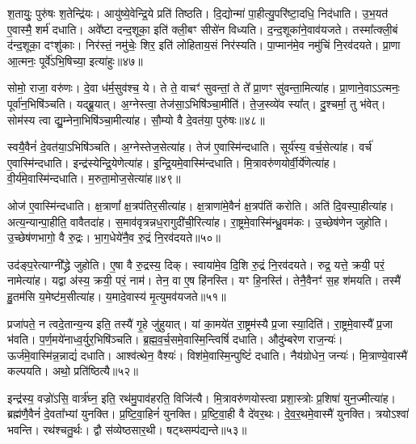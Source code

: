 श॒तायुः॒ पुरु॑षः श॒तेन्द्रि॑यः।
आयु॑ष्ये॒वेन्द्रि॒ये प्रति॑ तिष्ठति।
दि॒द्योन्मा॑ पा॒हीत्यु॒परि॑ष्टा॒दधि॒ निद॑धाति।
उ॒भ॒यत॑ ए॒वास्मै॒ शर्म॑ दधाति।
अवे᳚ष्टा दन्द॒शूका॒ इति॑ क्ली॒बꣳ सीसे॑न विध्यति।
द॒न्द॒शूका॑ने॒वाव॑यजते।
तस्मा᳚त्क्ली॒बं द॑न्द॒शूका॒ दꣳशु॑काः।
निर॑स्तं॒ नमु॑चेः॒ शिर॒ इति॑ लोहिताय॒सं निर॑स्यति।
पा॒प्मान॑मे॒व नमु॑चिं नि॒रव॑दयते।
प्रा॒णा आ॒त्मनः॒ पूर्वे॑\-ऽभि॒षिच्या॒ इत्या॑हुः॥४७॥

सोमो॒ राजा॒ वरु॑णः।
दे॒वा ध॑र्म॒सुव॑श्च॒ ये।
ते ते॒ वाचꣳ॑ सुवन्तां॒ ते ते᳚ प्रा॒णꣳ सु॑वन्ता॒मित्या॑ह।
प्रा॒णाने॒वा\-ऽऽत्मनः॒ पूर्वा॑न॒भिषि॑ञ्चति।
यद्ब्रू॒यात्।
अ॒ग्नेस्त्वा॒ तेज॑सा॒\-ऽभिषि॑ञ्चा॒मीति॑।
ते॒ज॒स्व्ये॑व स्या᳚त्।
दु॒श्चर्मा॒ तु भ॑वेत्।
सोम॑स्य त्वा द्यु॒म्नेना॒भिषि॑ञ्चा॒मीत्या॑ह।
सौ॒म्यो वै दे॒वत॑या॒ पुरु॑षः॥४८॥

स्वयै॒वैनं॑ दे॒वत॑या॒\-ऽभिषि॑ञ्चति।
अ॒ग्नेस्तेज॒सेत्या॑ह।
तेज॑ ए॒वास्मि॑न्दधाति।
सूर्य॑स्य॒ वर्च॒सेत्या॑ह।
वर्च॑ ए॒वास्मि॑न्दधाति।
इन्द्र॑स्येन्द्रि॒येणेत्या॑ह।
इ॒न्द्रि॒यमे॒वास्मि॑न्दधाति।
मि॒त्रावरु॑ण\-योर्वी॒र्ये॑णेत्या॑ह।
वी॒र्य॑मे॒वास्मि॑न्दधाति।
म॒रुता॒मोज॒सेत्या॑ह॥४९॥

ओज॑ ए॒वास्मि॑न्दधाति।
क्ष॒त्राणां᳚ क्ष॒त्रप॑तिर॒सीत्या॑ह।
क्ष॒त्राणा॑मे॒वैनं॑ क्ष॒त्रप॑तिं करोति।
अति॑ दि॒वस्पा॒हीत्या॑ह।
अत्य॒न्यान्पा॒हीति॒ वावैतदा॑ह।
स॒माव॑वृत्रन्नध॒रागुदी॑ची॒\-रित्या॑ह।
रा॒ष्ट्रमे॒वास्मि॑न्ध्रु॒वम॑कः।
उ॒च्छेष॑णेन जुहोति।
उ॒च्छेष॑णभागो॒ वै रु॒द्रः।
भा॒ग॒धेये॑नै॒व रु॒द्रं नि॒रव॑दयते॥५०॥

उद॑ङ्प॒रेत्याग्नी᳚द्ध्रे जुहोति।
ए॒षा वै रु॒द्रस्य॒ दिक्।
स्वाया॑मे॒व दि॒शि रु॒द्रं नि॒रव॑दयते।
रुद्र॒ यत्ते॒ क्रयी॒ परं॒ नामेत्या॑ह।
यद्वा अ॑स्य॒ क्रयी॒ परं॒ नाम॑।
तेन॒ वा ए॒ष हि॑नस्ति।
यꣳ हि॒नस्ति॑।
तेनै॒वैनꣳ॑ स॒ह श॑मयति।
तस्मै॑ हु॒तम॑सि य॒मेष्ट॑म॒सीत्या॑ह।
य॒मादे॒वास्य॑ मृ॒त्युमव॑यजते॥५१॥

प्रजा॑पते॒ न त्वदे॒तान्य॒न्य इति॒ तस्यै॑ गृ॒हे जु॑हुयात्।
यां का॒मये॑त रा॒ष्ट्रम॑स्यै प्र॒जा स्या॒दिति॑।
रा॒ष्ट्रमे॒वास्यै᳚ प्र॒जा भ॑वति।
प॒र्ण॒मये॑नाध्व॒र्युर॒भिषि॑ञ्चति।
ब्र॒ह्म॒व॒र्च॒समे॒वा\-स्मि॒न्त्विषिं॑ दधाति।
औदु॑म्बरेण राज॒न्यः॑।
ऊर्ज॑मे॒वा\-स्मि॑न्न॒न्नाद्यं॑ दधाति।
आश्व॑त्थेन॒ वैश्यः॑।
विश॑मे॒वास्मि॒न्पुष्टिं॑ दधाति।
नैय॑ग्रोधेन॒ जन्यः॑।
मि॒त्राण्ये॒वास्मै॑ कल्पयति।
अथो॒ प्रति॑\-ष्ठित्यै॥५२॥

इन्द्र॑स्य॒ वज्रो॑ऽसि॒ वार्त्र॑घ्न॒ इति॒ रथ॑मु॒पाव॑हरति॒ विजि॑त्यै।
मि॒त्रावरु॑णयोस्त्वा प्रशा॒स्त्रोः प्र॒शिषा॑ युन॒ज्मीत्या॑ह।
ब्रह्म॑णै॒वैनं॑ दे॒वता᳚भ्यां युनक्ति।
प्र॒ष्टि॒वा॒हिनं॑ युनक्ति।
प्र॒ष्टि॒वा॒ही वै दे॑वर॒थः।
दे॒व॒र॒थमे॒वास्मै॑ युनक्ति।
त्रयो\-ऽश्वा॑ भवन्ति।
रथ॑श्चतु॒र्थः।
द्वौ स॑व्येष्ठसार॒थी।
षट्थ्सम्प॑द्यन्ते॥५३॥

